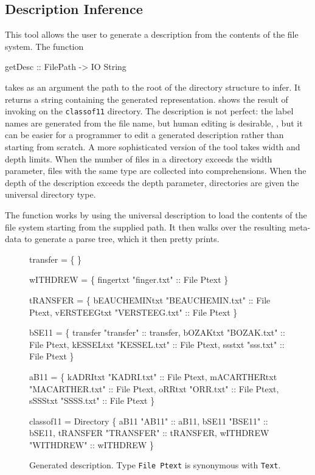 \subsection{Description Inference}
This tool allows the user to generate a \forest{} description from the
contents of the file system.   The function
\begin{code}
getDesc :: FilePath -> IO String
\end{code}
takes as an argument the path to the root of the directory structure
to infer.  It returns a string containing the generated
representation.   shows the result
of invoking  on the \texttt{classof11} directory.  
The description is not perfect: the label names are generated 
from the file name, but human editing is desirable, \etc, but it can
be easier for a programmer to edit a generated description rather than
starting from scratch.  A more sophisticated version of the tool 
takes width and depth limits. When the number of files in a directory
exceeds the width parameter, files with the same type are collected into
comprehensions.  When the depth of the description exceeds the depth
parameter, directories are given the universal directory type.

The  function works by using the universal description to
load the contents of the file system starting from the supplied path.
It then walks over the resulting meta-data to generate a \forest{}
parse tree, which it then pretty prints.


\begin{figure}
\begin{code}
 transfer =  \{
\}

 wITHDREW =  \{
    fingertxt  "finger.txt" :: File Ptext
\}

 tRANSFER =  \{
    bEAUCHEMINtxt  "BEAUCHEMIN.txt" :: File Ptext,
    vERSTEEGtxt  "VERSTEEG.txt" :: File Ptext
\}

 bSE11 =  \{
    transfer  "transfer" :: transfer,
    bOZAKtxt  "BOZAK.txt" :: File Ptext,
    kESSELtxt  "KESSEL.txt" :: File Ptext,
    ssstxt  "sss.txt" :: File Ptext
\}

 aB11 =  \{
    kADRItxt  "KADRI.txt" :: File Ptext,
    mACARTHERtxt  "MACARTHER.txt" :: File Ptext,
    oRRtxt  "ORR.txt" :: File Ptext,
    sSSStxt  "SSSS.txt" :: File Ptext
\}

 classof11 = Directory \{
    aB11  "AB11" :: aB11,
    bSE11  "BSE11" :: bSE11,
    tRANSFER  "TRANSFER" :: tRANSFER,
    wITHDREW  "WITHDREW" :: wITHDREW
\}
\end{code}
\caption{Generated description. Type \texttt{File Ptext} is synonymous
  with \texttt{Text}.}
\label{fig:generated-description}
\end{figure}

